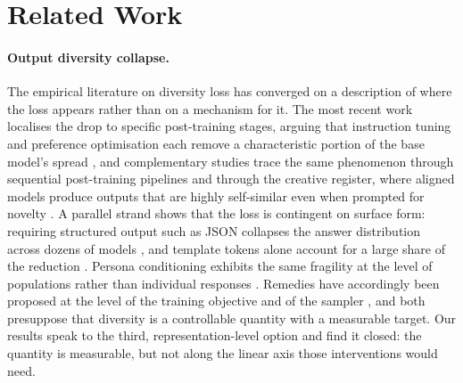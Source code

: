 \section{Related Work}

\paragraph{Output diversity collapse.}
The empirical literature on diversity loss has converged on a description of where the loss
appears rather than on a mechanism for it. The most recent work localises the drop to specific
post-training stages, arguing that instruction tuning and preference optimisation each remove a
characteristic portion of the base model's spread \citep{karouzos2026where}, and complementary
studies trace the same phenomenon through sequential post-training pipelines
\citep{liu2026representation} and through the creative register, where aligned models produce
outputs that are highly self-similar even when prompted for novelty \citep{matthews2026language}.
A parallel strand shows that the loss is contingent on surface form: requiring structured output
such as JSON collapses the answer distribution across dozens of models \citep{parikh2026structured},
and template tokens alone account for a large share of the reduction \citep{yun2025price}.
Persona conditioning exhibits the same fragility at the level of populations rather than
individual responses \citep{xiao2026chameleons}. Remedies have accordingly been proposed at the
level of the training objective \citep{li2025jointly} and of the sampler \citep{xu2026prism}, and
both presuppose that diversity is a controllable quantity with a measurable target. Our results
speak to the third, representation-level option and find it closed: the quantity is measurable,
but not along the linear axis those interventions would need.

